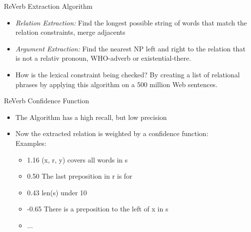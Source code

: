 \documentclass[11pt]{beamer}
\begin{document}
				
		\begin{frame}{ReVerb Extraction Algorithm}
			\begin{center}
				\begin{itemize}
				\item \textit{Relation Extraction: }Find the longest possible string of words that match the relation constraints, merge adjacents
				\item \textit{Argument Extraction:} Find the nearest NP left and right to the relation that is not a relativ pronoun, WHO-adverb or existential-there.
				\item How is the lexical constraint being checked? By creating a list of relational phrases by applying this algorithm on a 500 million Web sentences.
				\end{itemize}
			\end{center}
		\end{frame}
		\begin{frame}{ReVerb Confidence Function}
					\begin{center}
						\begin{itemize}
						\item The Algorithm has a high recall, but low precision
						\item Now the extracted relation is weighted by a confidence function:\\
						Examples:
						\begin{itemize}	
						\item 1.16 (x, r, y) covers all words in s
						\item 0.50 The last preposition in r is for
						\item 0.43 len(s) under 10
						\item -0.65 There is a preposition to the left of x in s 
						\item ...
						\end{itemize}
						\end{itemize}
						
					\end{center}
				\end{frame}
				
\end{document}
